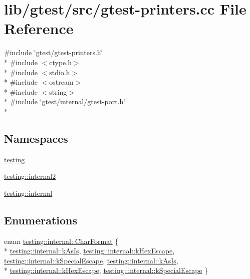 \hypertarget{gtest-printers_8cc}{\section{lib/gtest/src/gtest-\/printers.cc File Reference}
\label{gtest-printers_8cc}
}
{\ttfamily \#include \char`\"{}gtest/gtest-\/printers.\-h\char`\"{}}\\*
{\ttfamily \#include $<$ctype.\-h$>$}\\*
{\ttfamily \#include $<$stdio.\-h$>$}\\*
{\ttfamily \#include $<$ostream$>$}\\*
{\ttfamily \#include $<$string$>$}\\*
{\ttfamily \#include \char`\"{}gtest/internal/gtest-\/port.\-h\char`\"{}}\\*
\subsection*{Namespaces}
\begin{DoxyCompactItemize}
\item 
\hyperlink{namespacetesting}{testing}
\item 
\hyperlink{namespacetesting_1_1internal2}{testing\-::internal2}
\item 
\hyperlink{namespacetesting_1_1internal}{testing\-::internal}
\end{DoxyCompactItemize}
\subsection*{Enumerations}
\begin{DoxyCompactItemize}
\item 
enum \hyperlink{namespacetesting_1_1internal_ae2ef98247c76a50cdc80ceb4a6c81793}{testing\-::internal\-::\-Char\-Format} \{ \\*
\hyperlink{namespacetesting_1_1internal_ae2ef98247c76a50cdc80ceb4a6c81793ad9b0b58f986bb1d3d34abecf610ab42b}{testing\-::internal\-::k\-As\-Is}, 
\hyperlink{namespacetesting_1_1internal_ae2ef98247c76a50cdc80ceb4a6c81793ab87cb08fe5638cdc8c77ba2cae277f97}{testing\-::internal\-::k\-Hex\-Escape}, 
\hyperlink{namespacetesting_1_1internal_ae2ef98247c76a50cdc80ceb4a6c81793a8ba2e5593c3d9d8120e4f498f8421851}{testing\-::internal\-::k\-Special\-Escape}, 
\hyperlink{namespacetesting_1_1internal_ae2ef98247c76a50cdc80ceb4a6c81793ad9b0b58f986bb1d3d34abecf610ab42b}{testing\-::internal\-::k\-As\-Is}, 
\\*
\hyperlink{namespacetesting_1_1internal_ae2ef98247c76a50cdc80ceb4a6c81793ab87cb08fe5638cdc8c77ba2cae277f97}{testing\-::internal\-::k\-Hex\-Escape}, 
\hyperlink{namespacetesting_1_1internal_ae2ef98247c76a50cdc80ceb4a6c81793a8ba2e5593c3d9d8120e4f498f8421851}{testing\-::internal\-::k\-Special\-Escape}
 \}
\end{DoxyCompactItemize}
